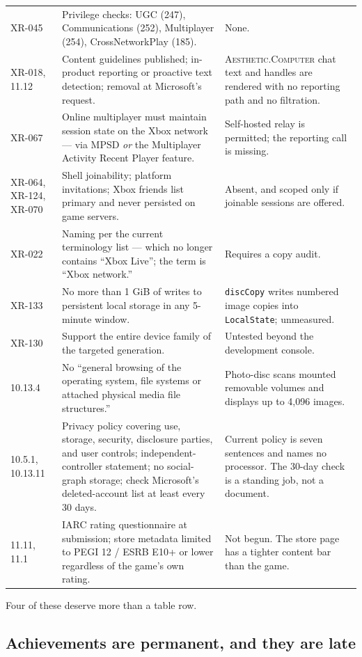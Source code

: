 \documentclass[10pt,letterpaper,twocolumn]{article}
\newcommand{\ac}{\textsc{Aesthetic.Computer}}
\newcommand{\code}[1]{\texttt{#1}}
\begin{document}
\begin{table}[!t]
\begin{tabularx}{\textwidth}{@{}P{0.13\textwidth}P{0.32\textwidth}L@{}}
XR-045 & Privilege checks: UGC (247), Communications (252), Multiplayer (254), CrossNetworkPlay (185). & None. \\
XR-018, 11.12 & Content guidelines published; in-product reporting or proactive text detection; removal at Microsoft's request. & \ac{} chat text and handles are rendered with no reporting path and no filtration. \\
XR-067 & Online multiplayer must maintain session state on the Xbox network --- via MPSD \emph{or} the Multiplayer Activity Recent Player feature. & Self-hosted relay is permitted; the reporting call is missing. \\
XR-064, XR-124, XR-070 & Shell joinability; platform invitations; Xbox friends list primary and never persisted on game servers. & Absent, and scoped only if joinable sessions are offered. \\
XR-022 & Naming per the current terminology list --- which no longer contains ``Xbox Live''; the term is ``Xbox network.'' & Requires a copy audit. \\
XR-133 & No more than 1 GiB of writes to persistent local storage in any 5-minute window. & \code{discCopy} writes numbered image copies into \code{LocalState}; unmeasured. \\
XR-130 & Support the entire device family of the targeted generation. & Untested beyond the development console. \\
10.13.4 & No ``general browsing of the operating system, file systems or attached physical media file structures.'' & Photo-disc scans mounted removable volumes and displays up to 4,096 images. \\
10.5.1, 10.13.11 & Privacy policy covering use, storage, security, disclosure parties, and user controls; independent-controller statement; no social-graph storage; check Microsoft's deleted-account list at least every 30 days. & Current policy is seven sentences and names no processor. The 30-day check is a standing job, not a document. \\
11.11, 11.1 & IARC rating questionnaire at submission; store metadata limited to PEGI 12 / ESRB E10+ or lower regardless of the game's own rating. & Not begun. The store page has a tighter content bar than the game. \\
\bottomrule
\end{tabularx}
\end{table}

Four of these deserve more than a table row.

\subsection{Achievements are permanent, and they are late}
\end{document}
